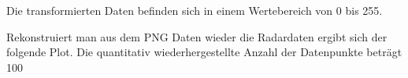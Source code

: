 Die transformierten Daten befinden sich in einem Wertebereich von 0 bis 255.


Rekonstruiert man aus dem PNG Daten wieder die Radardaten ergibt sich der folgende Plot. Die quantitativ wiederhergestellte Anzahl der Datenpunkte beträgt 100%

